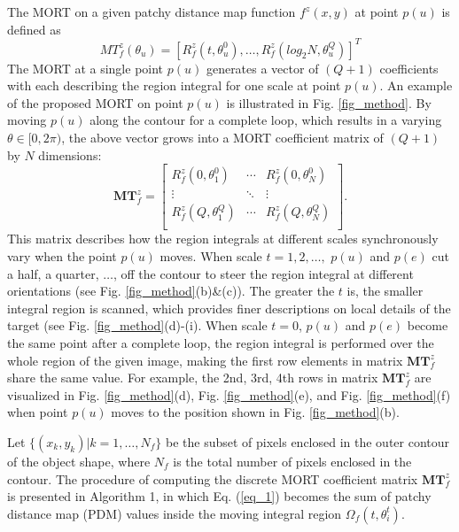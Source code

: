 \documentclass[letterpaper]{article} %
\begin{document}
The MORT on a given patchy distance map function $f^z (x,y)$ at point $p(u)$ is defined as
\begin{equation}
MT_f^z(\theta_u) =  [R_f^z (t,\theta_u^0) ,\dots, R_f^z (log_2 N,\theta_u^Q)]^T
\label{eq_3}
\end{equation}
The MORT at a single point $p(u)$ generates a vector of $(Q+1)$ coefficients with each describing the region integral for one scale at point $p(u)$. An example of the proposed MORT on point $p(u)$ is illustrated in Fig. \ref{fig_method}. By moving $p(u)$ along the contour for a complete loop, which results in a varying $\theta\in[0,2\pi)$, the above vector grows into a MORT coefficient matrix of $(Q+1)$ by $N$ dimensions:
\begin{equation}
\boldsymbol{MT}_f^z  = \left[
\begin{matrix}
R_f^z (0,\theta_1^0)    & \cdots & R_f^z (0,\theta_N^0)      \\
 \vdots  & \ddots & \vdots \\
 R_f^z (Q,\theta_1^Q)     & \cdots & R_f^z (Q,\theta_N^Q)     \\
\end{matrix}
\right]. 
\label{eq_4}
\end{equation}
This matrix describes how the region integrals at different scales synchronously vary when the point $p(u)$ moves. When scale $t=1,2,\dots,$ $p(u)$ and $p(e)$ cut a half, a quarter, $\dots$, off the contour to steer the region integral at different orientations (see Fig. \ref{fig_method}(b)\&(c)). The greater the $t$ is, the smaller integral region is scanned, which provides finer descriptions on local details of the target (see Fig. \ref{fig_method}(d)-(i). When scale $t=0$, $p(u)$ and $p(e)$ become the same point after a complete loop, the region integral is performed over the whole region of the given image, making the first row elements in matrix $\boldsymbol{MT}_f^z$ share the same value. For example, the 2nd, 3rd, 4th rows in matrix $\boldsymbol{MT}_f^z$  are visualized in Fig. \ref{fig_method}(d), Fig. \ref{fig_method}(e), and Fig. \ref{fig_method}(f) when point $p(u)$ moves to the position shown in Fig. \ref{fig_method}(b). 

Let $\{(x_k,y_k ) | k=1,\dots,N_f\}$ be the subset of pixels enclosed in the outer contour of the object shape, where $N_f$ is the total number of pixels enclosed in the contour. The procedure of computing the discrete MORT coefficient matrix $\boldsymbol{MT}_f^z$  is presented in Algorithm 1, in which Eq. (\ref{eq_1}) becomes the sum of patchy distance map (PDM) values inside the moving integral region $\Omega_f (t,\theta_i^t )$.
\end{document}
